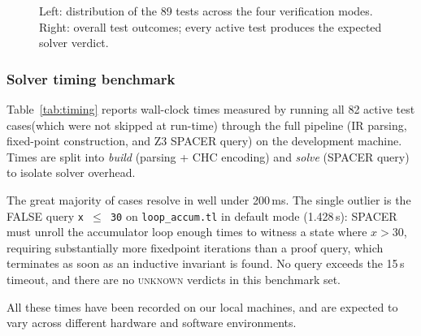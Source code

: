 \begin{figure}[H]
  \centering
  \begin{minipage}{0.45\textwidth}
    \centering
  \end{minipage}
  \begin{minipage}{0.45\textwidth}
    \centering
  \end{minipage}
  \caption{Left: distribution of the 89 tests across the four verification
           modes. Right: overall test outcomes; every active test produces
           the expected solver verdict.}
  \label{fig:pies}
\end{figure}

\subsubsection*{Solver timing benchmark}

Table~\ref{tab:timing} reports wall-clock times measured by running all
82 active test cases(which were not skipped at run-time) through the full pipeline (IR parsing, fixed-point
construction, and Z3 SPACER query) on the development machine.
Times are split into \emph{build} (parsing + CHC encoding) and \emph{solve}
(SPACER query) to isolate solver overhead.

The great majority of cases resolve in well under 200\,ms.
The single outlier is the FALSE query \texttt{x~$\leq$~30} on
\texttt{loop\_accum.tl} in default mode (1.428\,s):
SPACER must unroll the accumulator loop enough times to witness a state
where $x > 30$, requiring substantially more fixedpoint iterations than a
proof query, which terminates as soon as an inductive invariant is found.
No query exceeds the 15\,s timeout, and there are no \textsc{unknown}
verdicts in this benchmark set.

All these times have been recorded on our local machines, and are expected to vary across different
hardware and software environments.

